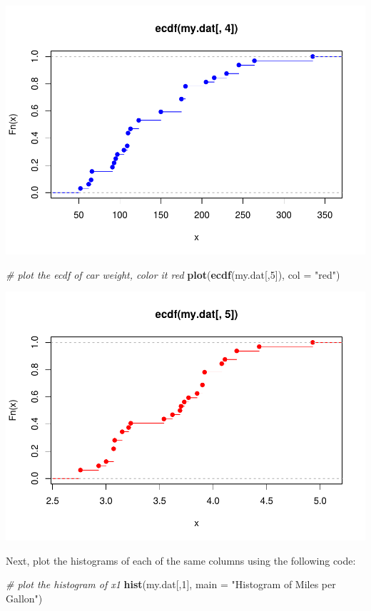 \documentclass[
]{article}
\newenvironment{Shaded}{\begin{snugshade}}{\end{snugshade}}
\newcommand{\CommentTok}[1]{\textcolor[rgb]{0.56,0.35,0.01}{\textit{#1}}}
\newcommand{\DataTypeTok}[1]{\textcolor[rgb]{0.13,0.29,0.53}{#1}}
\newcommand{\DecValTok}[1]{\textcolor[rgb]{0.00,0.00,0.81}{#1}}
\newcommand{\KeywordTok}[1]{\textcolor[rgb]{0.13,0.29,0.53}{\textbf{#1}}}
\newcommand{\NormalTok}[1]{#1}
\newcommand{\StringTok}[1]{\textcolor[rgb]{0.31,0.60,0.02}{#1}}
\begin{document}
\includegraphics{CA2_DataAnalysis_files/figure-latex/unnamed-chunk-14-2.pdf}

\begin{Shaded}
\begin{Highlighting}[]
\CommentTok{# plot the ecdf of car weight, color it red}
\KeywordTok{plot}\NormalTok{(}\KeywordTok{ecdf}\NormalTok{(my.dat[,}\DecValTok{5}\NormalTok{]), }\DataTypeTok{col =} \StringTok{"red"}\NormalTok{)}
\end{Highlighting}
\end{Shaded}

\includegraphics{CA2_DataAnalysis_files/figure-latex/unnamed-chunk-14-3.pdf}

Next, plot the histograms of each of the same columns using the
following code:

\begin{Shaded}
\begin{Highlighting}[]
\CommentTok{# plot the histogram of x1}
\KeywordTok{hist}\NormalTok{(my.dat[,}\DecValTok{1}\NormalTok{], }\DataTypeTok{main =} \StringTok{"Histogram of Miles per Gallon"}\NormalTok{)}
\end{Highlighting}
\end{Shaded}
\end{document}
